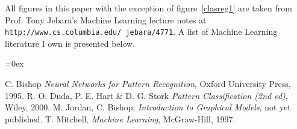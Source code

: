 \documentclass{ecctd01} %
\begin{document}
All figures in this paper with the exception of figure~\ref{clasreg1}
are taken from Prof. Tony Jebara's Machine Learning lecture notes at
{\tt http://www.cs.columbia.edu/~jebara/4771}. A list of Machine
Learning literature I own is presented below. 

\begin{thebibliography}{9}
\itemsep=0ex %
  
 C. Bishop {\em Neural Networks for Pattern
  Recognition}, Oxford University Press, 1995.
 R. O. Duda, P. E. Hart \& D. G. Stork {\em Pattern
  Classification (2nd ed)}, Wiley, 2000.
 M. Jordan, C. Bishop, {\em Introduction to
  Graphical Models}, not yet published.
 T. Mitchell, {\em Machine Learning}, McGraw-Hill, 1997.

\end{thebibliography}
\end{document}
